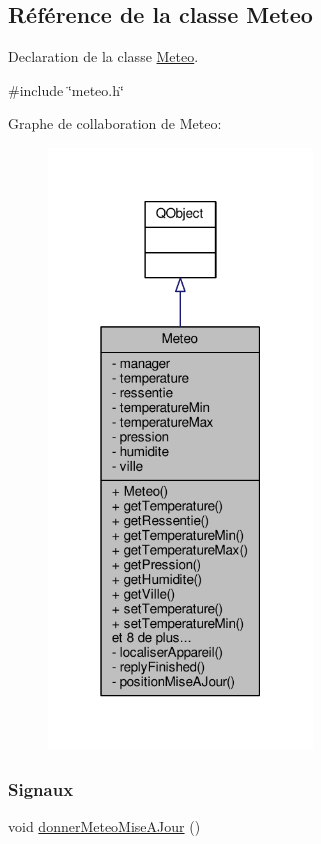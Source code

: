 \hypertarget{class_meteo}{}\subsection{Référence de la classe Meteo}
\label{class_meteo}


Declaration de la classe \hyperlink{class_meteo}{Meteo}.  




{\ttfamily \#include \char`\"{}meteo.\+h\char`\"{}}



Graphe de collaboration de Meteo\+:\nopagebreak
\begin{figure}[H]
\begin{center}
\leavevmode
\includegraphics[width=199pt]{class_meteo__coll__graph}
\end{center}
\end{figure}
\subsubsection*{Signaux}
\begin{DoxyCompactItemize}
\item 
void \hyperlink{class_meteo_ab58994e421e7f44a81bd802c6b167cfb}{donner\+Meteo\+Mise\+A\+Jour} ()
\end{DoxyCompactItemize}
